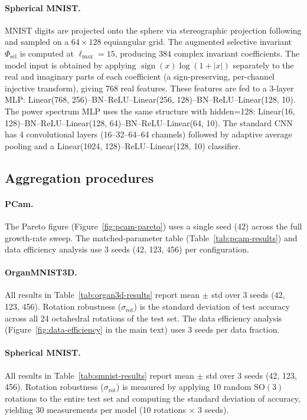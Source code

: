 \documentclass{article}
\theoremstyle{definition}
\theoremstyle{remark}
\newcommand{\SO}{\mathrm{SO}}
\theoremstyle{definition}
\begin{document}
\paragraph{Spherical MNIST.}
MNIST digits are projected onto the sphere via stereographic
projection following \citet{cohen2018spherical} and sampled on a
$64 \times 128$ equiangular grid. The augmented selective invariant
$\Phi_{\mathrm{sel}}$ is
computed at $\ell_{\max} = 15$, producing 384 complex invariant
coefficients. The model input is obtained by applying
$\operatorname{sign}(x)\log(1+|x|)$ separately to the real and
imaginary parts of each coefficient (a sign-preserving, per-channel
injective transform), giving 768 real features. These features are
fed to a 3-layer MLP: Linear(768, 256)--BN--ReLU--Linear(256,
128)--BN--ReLU--Linear(128, 10). The power spectrum MLP uses the
same structure with hidden=128: Linear(16, 128)--BN--ReLU--Linear(128,
64)--BN--ReLU--Linear(64, 10). The standard CNN has 4 convolutional
layers (16--32--64--64 channels) followed by adaptive average pooling
and a Linear(1024, 128)--ReLU--Linear(128, 10) classifier.

\subsection{Aggregation procedures}

\paragraph{PCam.}
The Pareto figure (Figure~\ref{fig:pcam-pareto}) uses a single seed
(42) across the full growth-rate sweep. The matched-parameter table
(Table~\ref{tab:pcam-results}) and data efficiency analysis use 3 seeds
(42, 123, 456) per configuration.

\paragraph{OrganMNIST3D.}
All results in Table~\ref{tab:organ3d-results} report mean $\pm$ std
over 3 seeds (42, 123, 456). Rotation robustness
($\sigma_{\mathrm{rot}}$) is the standard deviation of test accuracy
across all 24 octahedral rotations of the test set. The data
efficiency analysis (Figure~\ref{fig:data-efficiency} in the main text) uses 3 seeds per data
fraction.

\paragraph{Spherical MNIST.}
All results in Table~\ref{tab:smnist-results} report mean $\pm$ std
over 3 seeds (42, 123, 456). Rotation robustness
($\sigma_{\mathrm{rot}}$) is measured by applying 10 random $\SO(3)$
rotations to the entire test set and computing the standard deviation
of accuracy, yielding 30 measurements per model (10 rotations
$\times$ 3 seeds).
\end{document}
